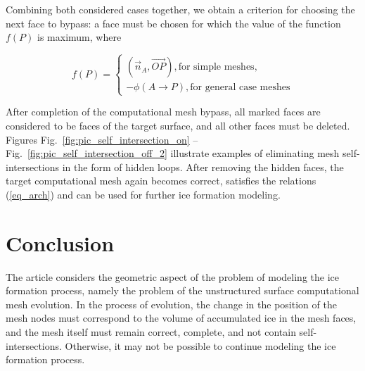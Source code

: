 \documentclass[
11pt,%
tightenlines,%
twoside,%
onecolumn,%
nofloats,%
nobibnotes,%
nofootinbib,%
superscriptaddress,%
noshowpacs,%
centertags]%
{revtex4-2}
\begin{document}
Combining both considered cases together, we obtain a criterion for choosing the next face to bypass: a face must be chosen for which the value of the function $f(P)$ is maximum, where

\begin{equation}
f(P) = 
\begin{cases}
(\vec{n}_A, \vec{OP}), \text{for simple meshes}, \\
-\phi(A \rightarrow P), \text{for general case meshes}
\end{cases}
\end{equation}

After completion of the computational mesh bypass, all marked faces are considered to be faces of the target surface, and all other faces must be deleted.
Figures Fig.~\ref{fig:pic_self_intersection_on} -- Fig.~\ref{fig:pic_self_intersection_off_2} illustrate examples of eliminating mesh self-intersections in the form of hidden loops.
After removing the hidden faces, the target computational mesh again becomes correct, satisfies the relations (\ref{eq_arch}) and can be used for further ice formation modeling.


\section{Conclusion}

The article considers the geometric aspect of the problem of modeling the ice formation process, namely the problem of the unstructured surface computational mesh evolution.
In the process of evolution, the change in the position of the mesh nodes must correspond to the volume of accumulated ice in the mesh faces, and the mesh itself must remain correct, complete, and not contain self-intersections.
Otherwise, it may not be possible to continue modeling the ice formation process.
\end{document}
